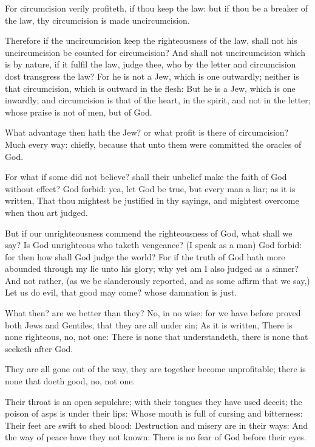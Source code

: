 \Verse For circumcision verily profiteth, if thou keep the law: but if thou be a breaker of the law, thy circumcision is made uncircumcision.

\Verse Therefore if the uncircumcision keep the righteousness of the law, shall not his uncircumcision be counted for circumcision?  \Verse And shall not uncircumcision which is by nature, if it fulfil the law, judge thee, who by the letter and circumcision dost transgress the law?  \Verse For he is not a Jew, which is one outwardly; neither is that circumcision, which is outward in the flesh: \Verse But he is a Jew, which is one inwardly; and circumcision is that of the heart, in the spirit, and not in the letter; whose praise is not of men, but of God.


\Chapter
\Verse What advantage then hath the Jew? or what profit is there of circumcision?  \Verse Much every way: chiefly, because that unto them were committed the oracles of God.

\Verse For what if some did not believe? shall their unbelief make the faith of God without effect?  \Verse God forbid: yea, let God be true, but every man a liar; as it is written, That thou mightest be justified in thy sayings, and mightest overcome when thou art judged.

\Verse But if our unrighteousness commend the righteousness of God, what shall we say? Is God unrighteous who taketh vengeance? (I speak as a man) \Verse God forbid: for then how shall God judge the world?  \Verse For if the truth of God hath more abounded through my lie unto his glory; why yet am I also judged as a sinner?  \Verse And not rather, (as we be slanderously reported, and as some affirm that we say,) Let us do evil, that good may come? whose damnation is just.

\Verse What then? are we better than they? No, in no wise: for we have before proved both Jews and Gentiles, that they are all under sin; \Verse As it is written, There is none righteous, no, not one: \Verse There is none that understandeth, there is none that seeketh after God.

\Verse They are all gone out of the way, they are together become unprofitable; there is none that doeth good, no, not one.

\Verse Their throat is an open sepulchre; with their tongues they have used deceit; the poison of asps is under their lips: \Verse Whose mouth is full of cursing and bitterness: \Verse Their feet are swift to shed blood: \Verse Destruction and misery are in their ways: \Verse And the way of peace have they not known: \Verse There is no fear of God before their eyes.

